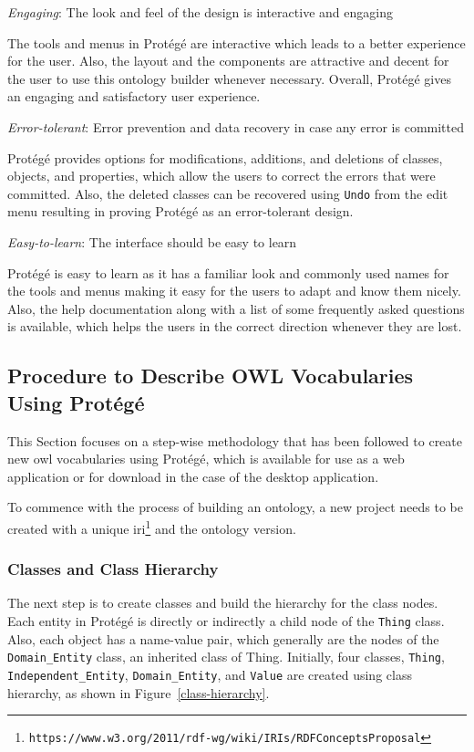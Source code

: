 \begin{doublespace}
\emph{Engaging}: The look and feel of the design is interactive and engaging 

The tools and menus in Protégé are interactive 
which leads to a better experience for the user. 
Also, 
the layout and the components are attractive and 
decent for the user to use this ontology builder 
whenever necessary. 
Overall, 
Protégé gives an engaging and satisfactory user experience.

\emph{Error-tolerant}: Error prevention and data recovery in case any error is committed

Protégé provides options for modifications, additions, 
and deletions of classes, objects, and properties, 
which allow the users to correct the errors that were committed. 
Also, 
the deleted classes can be recovered using {\tt Undo} 
from the edit menu resulting in proving Protégé as an error-tolerant design.

\emph{Easy-to-learn}: The interface should be easy to learn

Protégé is easy to learn as it has a familiar look and 
commonly used names for the tools and menus making it easy 
for the users to adapt and know them nicely. 
Also, 
the help documentation
along with a list of some frequently asked questions is available,
which helps the users in the correct direction whenever they are lost.

\subsection{Procedure to Describe OWL Vocabularies Using Protégé}
\label{subsec:protegeprocedure}

This Section focuses on a step-wise methodology 
that has been followed to create new \ac{owl} 
vocabularies using Protégé,
which
is available for use as a web application or
for download in the case of the desktop application.

To commence with the process of building an ontology, 
a new project needs to be created 
with a unique \ac{iri}\footnote{\tt https://www.w3.org/2011/rdf-wg/wiki/IRIs/RDFConceptsProposal} 
and the ontology version. 

\subsubsection{Classes and Class Hierarchy}
\label{subsubsec:classhierarchy}

The next step is to create classes and build the hierarchy for the class nodes. 
Each entity in Protégé is directly or indirectly a child node of the {\tt Thing} class. 
Also, 
each object has a name-value pair, 
which generally are the nodes of the {\tt Domain\_Entity} class, 
an inherited class of Thing. 
Initially, 
four classes, 
{\tt Thing}, 
{\tt Independent\_Entity},
{\tt Domain\_Entity}, 
and 
{\tt Value} 
are created using class hierarchy, 
as shown in Figure~\ref{class-hierarchy}. 


\end{doublespace}
